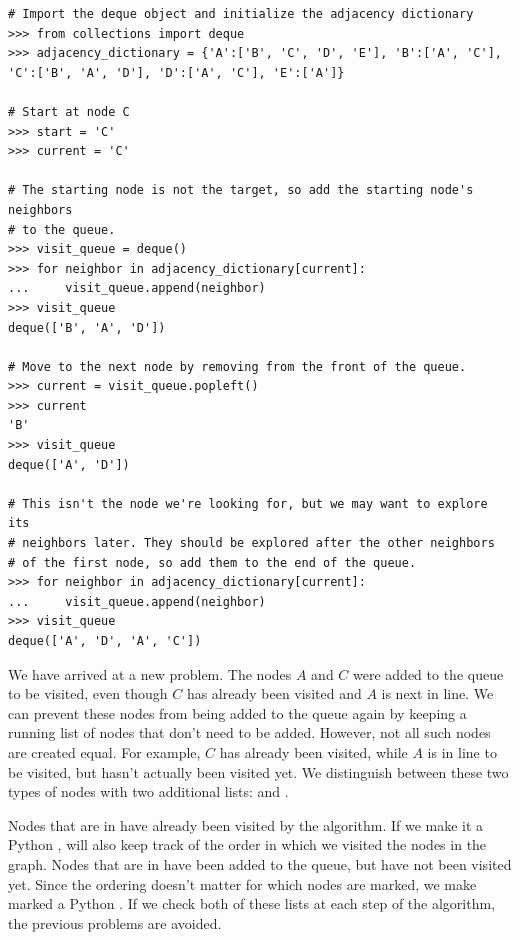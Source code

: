 \begin{lstlisting}
# Import the deque object and initialize the adjacency dictionary
>>> from collections import deque
>>> adjacency_dictionary = {'A':['B', 'C', 'D', 'E'], 'B':['A', 'C'],
'C':['B', 'A', 'D'], 'D':['A', 'C'], 'E':['A']}

# Start at node C
>>> start = 'C'
>>> current = 'C'

# The starting node is not the target, so add the starting node's neighbors
# to the queue.
>>> visit_queue = deque()
>>> for neighbor in adjacency_dictionary[current]:
...     visit_queue.append(neighbor)
>>> visit_queue
deque(['B', 'A', 'D'])

# Move to the next node by removing from the front of the queue.
>>> current = visit_queue.popleft()
>>> current
'B'
>>> visit_queue
deque(['A', 'D'])

# This isn't the node we're looking for, but we may want to explore its 
# neighbors later. They should be explored after the other neighbors
# of the first node, so add them to the end of the queue.
>>> for neighbor in adjacency_dictionary[current]:
...     visit_queue.append(neighbor)
>>> visit_queue
deque(['A', 'D', 'A', 'C'])
\end{lstlisting}

We have arrived at a new problem.
The nodes $A$ and $C$ were added to the queue to be visited, even though $C$ has already been visited and $A$ is next in line.
We can prevent these nodes from being added to the queue again by keeping a running list of nodes that don't need to be added.
However, not all such nodes are created equal.
For example, $C$ has already been visited, while $A$ is in line to be visited, but hasn't actually been visited yet.
We distinguish between these two types of nodes with two additional lists:  and .

Nodes that are in  have already been visited by the algorithm.
If we make it a Python ,  will also keep track of the order in which we visited the nodes in the graph.
Nodes that are in  have been added to the queue, but have not been visited yet.
Since the ordering doesn't matter for which nodes are marked, we make marked a Python .
If we check both of these lists at each step of the algorithm, the previous problems are avoided.

